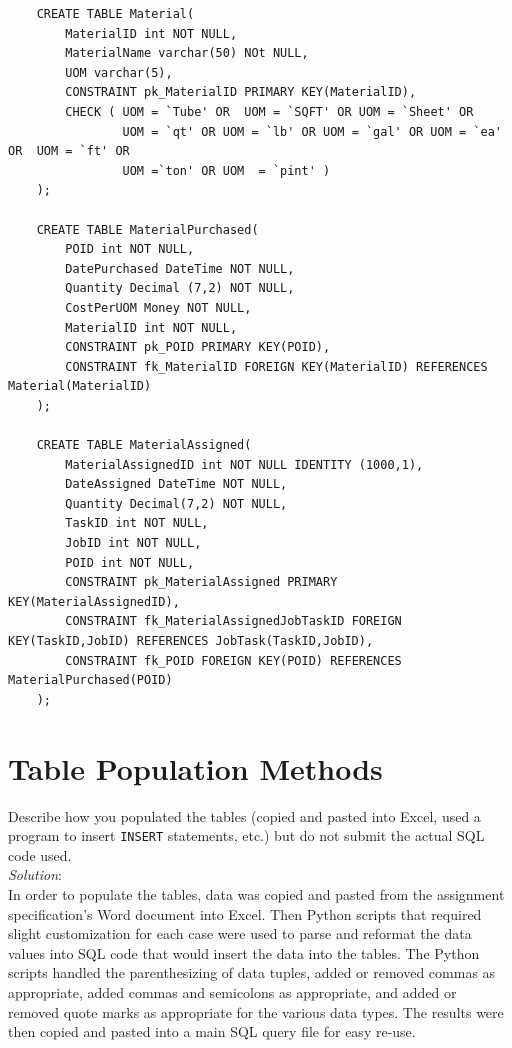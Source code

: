 \documentclass{article}
\begin{document}
\begin{verbatim}
    CREATE TABLE Material(
        MaterialID int NOT NULL,
        MaterialName varchar(50) NOt NULL,
        UOM varchar(5),
        CONSTRAINT pk_MaterialID PRIMARY KEY(MaterialID),
        CHECK ( UOM = `Tube' OR  UOM = `SQFT' OR UOM = `Sheet' OR 
                UOM = `qt' OR UOM = `lb' OR UOM = `gal' OR UOM = `ea' OR  UOM = `ft' OR
                UOM =`ton' OR UOM  = `pint' )
    );

    CREATE TABLE MaterialPurchased(
        POID int NOT NULL,
        DatePurchased DateTime NOT NULL,
        Quantity Decimal (7,2) NOT NULL,
        CostPerUOM Money NOT NULL,
        MaterialID int NOT NULL,
        CONSTRAINT pk_POID PRIMARY KEY(POID),
        CONSTRAINT fk_MaterialID FOREIGN KEY(MaterialID) REFERENCES Material(MaterialID)
    );

    CREATE TABLE MaterialAssigned(
        MaterialAssignedID int NOT NULL IDENTITY (1000,1),
        DateAssigned DateTime NOT NULL,
        Quantity Decimal(7,2) NOT NULL,
        TaskID int NOT NULL,
        JobID int NOT NULL,
        POID int NOT NULL,
        CONSTRAINT pk_MaterialAssigned PRIMARY KEY(MaterialAssignedID),
        CONSTRAINT fk_MaterialAssignedJobTaskID FOREIGN KEY(TaskID,JobID) REFERENCES JobTask(TaskID,JobID),
        CONSTRAINT fk_POID FOREIGN KEY(POID) REFERENCES MaterialPurchased(POID)
    );
\end{verbatim}

\section{Table Population Methods}
Describe how you populated the tables (copied and pasted into Excel, used a program to insert \texttt{INSERT} statements, etc.) but do not submit the actual SQL code used.\\

\textit{Solution}:\\
In order to populate the tables, data was copied and pasted from the assignment specification's Word document into Excel. Then Python scripts that required slight customization for each case were used to parse and reformat the data values into SQL code that would insert the data into the tables. The Python scripts handled the parenthesizing of data tuples, added or removed commas as appropriate, added commas and semicolons as appropriate, and added or removed quote marks as appropriate for the various data types. The results were then copied and pasted into a main SQL query file for easy re-use.\\
\end{document}

